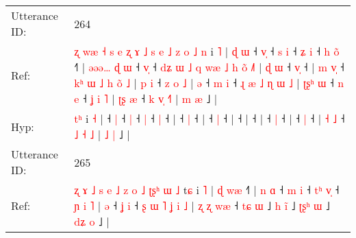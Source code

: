 \documentclass[10pt]{article}
\DeclareRobustCommand{\hl}[1]{{\textcolor{red}{#1}}}
\begin{document}
\begin{longtable}{ll}
 \\
\midrule
Utterance ID: & 264 \\
Ref: & \hl{ʐ}\hl{ }\hl{w}\hl{æ}\hl{ }\hl{˧}\hl{ }\hl{s}\hl{ }\hl{e}\hl{ }\hl{ʐ}\hl{ }\hl{ɤ}\hl{ }\hl{˩}\hl{ }\hl{s}\hl{ }\hl{e}\hl{ }\hl{˩}\hl{ }\hl{z}\hl{ }\hl{o}\hl{ }\hl{˩}\hl{ }\hl{n} i \hl{˥} |\hl{ }\hl{ɖ}\hl{ }\hl{ɯ} ˧ \hl{v}\hl{̩} ˧\hl{ }\hl{s} \hl{i} ˧\hl{ }\hl{ʑ} \hl{i} ˧\hl{ }\hl{h} \hl{o}\hl{̃} ˧\hl{˥} |\hl{ }\hl{ə}\hl{ə}\hl{ə}\hl{…}\hl{ }\hl{ɖ}\hl{ }\hl{ɯ} ˧ \hl{v}\hl{̩} ˧\hl{ }\hl{d}\hl{ʑ}\hl{ }\hl{ɯ}\hl{ }\hl{˩}\hl{ }\hl{q}\hl{ }\hl{w}\hl{æ}\hl{ }\hl{˩}\hl{ }\hl{h}\hl{ }\hl{o}\hl{̃}\hl{ }\hl{˩}\hl{˥} |\hl{ }\hl{ɖ}\hl{ }\hl{ɯ} ˧ \hl{v}\hl{̩} ˧ |\hl{ }\hl{m}\hl{ }\hl{v}\hl{̩} ˧\hl{ }\hl{k}\hl{ʰ}\hl{ }\hl{ɯ}\hl{ }\hl{˩}\hl{ }\hl{h}\hl{ }\hl{o}\hl{̃}\hl{ }\hl{˩} |\hl{ }\hl{p}\hl{ }\hl{i} ˧\hl{ }\hl{z}\hl{ }\hl{o}\hl{ }\hl{˩} |\hl{ }\hl{ə} ˧\hl{ }\hl{m} \hl{i} ˧\hl{ }\hl{ɻ}\hl{ }\hl{æ}\hl{ }\hl{˩}\hl{ }\hl{ɳ}\hl{ }\hl{ɯ}\hl{ }\hl{˩} |\hl{ }\hl{ʈ}\hl{ʂ}\hl{ʰ}\hl{ }\hl{ɯ} ˧\hl{ }\hl{n} \hl{e} ˧\hl{ }\hl{ʝ}\hl{ }\hl{i}\hl{ }\hl{˥} | \hl{ʈ}\hl{ʂ} \hl{æ} ˧ \hl{k} \hl{v}\hl{̩} \hl{˧}\hl{˥} | \hl{m} \hl{æ} ˩ |
 \\
Hyp: & \hl{}\hl{}\hl{}\hl{}\hl{}\hl{}\hl{}\hl{}\hl{}\hl{}\hl{}\hl{}\hl{}\hl{}\hl{}\hl{}\hl{}\hl{}\hl{}\hl{}\hl{}\hl{}\hl{}\hl{}\hl{}\hl{}\hl{}\hl{}\hl{t}\hl{ʰ} i \hl{˧} |\hl{}\hl{}\hl{}\hl{} ˧ \hl{}\hl{|} ˧\hl{}\hl{} \hl{|} ˧\hl{}\hl{} \hl{|} ˧\hl{}\hl{} \hl{}\hl{|} ˧\hl{} |\hl{}\hl{}\hl{}\hl{}\hl{}\hl{}\hl{}\hl{}\hl{} ˧ \hl{}\hl{|} ˧\hl{}\hl{}\hl{}\hl{}\hl{}\hl{}\hl{}\hl{}\hl{}\hl{}\hl{}\hl{}\hl{}\hl{}\hl{}\hl{}\hl{}\hl{}\hl{}\hl{}\hl{}\hl{} |\hl{}\hl{}\hl{}\hl{} ˧ \hl{}\hl{|} ˧ |\hl{}\hl{}\hl{}\hl{}\hl{} ˧\hl{}\hl{}\hl{}\hl{}\hl{}\hl{}\hl{}\hl{}\hl{}\hl{}\hl{}\hl{}\hl{}\hl{} |\hl{}\hl{}\hl{}\hl{} ˧\hl{}\hl{}\hl{}\hl{}\hl{}\hl{} |\hl{}\hl{} ˧\hl{}\hl{} \hl{|} ˧\hl{}\hl{}\hl{}\hl{}\hl{}\hl{}\hl{}\hl{}\hl{}\hl{}\hl{}\hl{} |\hl{}\hl{}\hl{}\hl{}\hl{}\hl{} ˧\hl{}\hl{} \hl{|} ˧\hl{}\hl{}\hl{}\hl{}\hl{}\hl{} | \hl{}\hl{˧} \hl{˩} ˧ \hl{˩} \hl{}\hl{˧} \hl{}\hl{˩} | \hl{˩} \hl{|} ˩ |
 \\
\midrule
Utterance ID: & 265 \\
Ref: & \hl{ʐ}\hl{ }\hl{ɤ}\hl{ }\hl{˩}\hl{ }\hl{s}\hl{ }\hl{e}\hl{ }\hl{˩}\hl{ }\hl{z}\hl{ }\hl{o}\hl{ }\hl{˩}\hl{ }\hl{ʈ}\hl{ʂ}\hl{ʰ}\hl{ }\hl{ɯ}\hl{ }\hl{˩}\hl{ }t\hl{ɕ} i \hl{˥} |\hl{ }\hl{ɖ}\hl{ }\hl{w}\hl{æ} ˧\hl{˥} |\hl{ }\hl{n}\hl{ }\hl{ɑ} ˧\hl{ }\hl{m} \hl{i} ˧\hl{ }\hl{t}\hl{ʰ} \hl{v}\hl{̩} ˧\hl{ }\hl{ɲ}\hl{ }\hl{i}\hl{ }\hl{˥} |\hl{ }\hl{ə} ˧\hl{ }\hl{ʝ} \hl{i} ˧\hl{ }\hl{ʂ}\hl{ }\hl{ɯ}\hl{ }\hl{˥}\hl{ }\hl{ʝ}\hl{ }\hl{i}\hl{ }\hl{˩} |\hl{ }\hl{ʐ}\hl{ }\hl{ʐ}\hl{ }\hl{w}\hl{æ} ˧ \hl{t}\hl{ɕ} \hl{ɯ} ˩\hl{ }\hl{h} \hl{i}\hl{̃} ˩\hl{ }\hl{ʈ}\hl{ʂ}\hl{ʰ} \hl{ɯ} ˩\hl{ }\hl{d}\hl{ʑ} \hl{o} ˩ |

\end{longtable}
\end{document}
